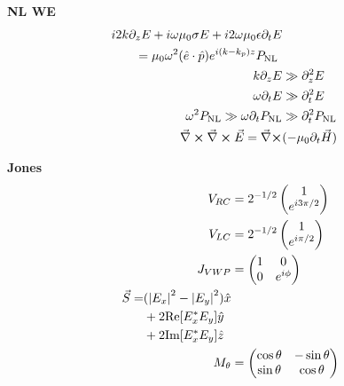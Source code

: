 \documentclass[12pt]{article}
\begin{document}
\begin{multicols}{3}
\textbf{NL WE}
\begin{align}
  \begin{split}
    i2k\partial_zE + i\omega\mu_0\sigma E &+ i2\omega\mu_0\epsilon \partial_t E\\
    = \mu_0\omega^2(\hat{e} \cdot \hat{p})&e^{i(k-k_p)z}P_{\textrm{NL}}
  \end{split}\\
  k \partial_z E &\gg \partial_z^2 E\\
  \omega \partial_t E &\gg \partial_t^2 E\\
  \omega^2 P_{\textrm{NL}} \gg \omega \partial_t P_{\textrm{NL}} &\gg \partial_t^2 P_{\textrm{NL}}\\
  \vec{\nabla} \cross \vec{\nabla} \cross \vec{E} = \vec{\nabla} \cross &(-\mu_0 \partial_t \vec{H})
\end{align}

\textbf{Jones}
\begin{align}
  V_{RC} &= 2^{-1/2} \begin{pmatrix}1\\e^{i3\pi/2}\end{pmatrix}\\
  V_{LC} &= 2^{-1/2} \begin{pmatrix}1\\e^{i\pi/2}\end{pmatrix}\\
  J_{VWP} &= \begin{pmatrix} 1 & 0\\0 & e^{i \phi}\end{pmatrix}\\
  \begin{split}
    \vec{S} {}= &(\abs{E_x}^2 - \abs{E_y}^2) \hat{x}\\
    &+ 2\textrm{Re}[E_x^{*}E_y] \hat{y}\\
    &+ 2\textrm{Im}[E_x^{*}E_y] \hat{z}
  \end{split}\\
  M_{\theta} &= \begin{pmatrix}
    \cos\theta & -\sin\theta\\
    \sin\theta & \cos\theta
  \end{pmatrix}\\
\end{align}


\end{multicols}
\end{document}
